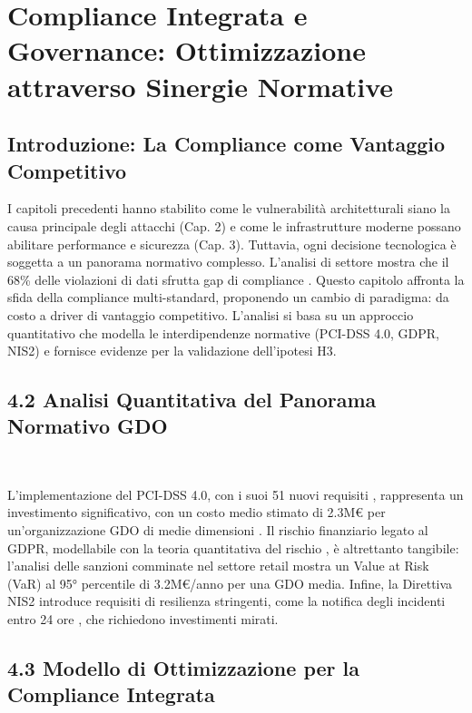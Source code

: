 \chapter{Compliance Integrata e Governance: Ottimizzazione attraverso Sinergie Normative}


\section{Introduzione: La Compliance come Vantaggio Competitivo}

I capitoli precedenti hanno stabilito come le vulnerabilità architetturali siano la causa principale degli attacchi (Cap. 2) e come le infrastrutture moderne possano abilitare performance e sicurezza (Cap. 3). Tuttavia, ogni decisione tecnologica è soggetta a un panorama normativo complesso. L'analisi di settore mostra che il 68\% delle violazioni di dati sfrutta gap di compliance \autocite{verizon2024}. Questo capitolo affronta la sfida della compliance multi-standard, proponendo un cambio di paradigma: da costo a driver di vantaggio competitivo. L'analisi si basa su un approccio quantitativo che modella le interdipendenze normative (PCI-DSS 4.0, GDPR, NIS2) e fornisce evidenze per la validazione dell'ipotesi H3.

\section{4.2 Analisi Quantitativa del Panorama Normativo GDO}\

L'implementazione del PCI-DSS 4.0, con i suoi 51 nuovi requisiti \autocite{pcidss2024}, rappresenta un investimento significativo, con un costo medio stimato di 2.3M€ per un'organizzazione GDO di medie dimensioni \autocite{Gartner2024gdpr}. Il rischio finanziario legato al GDPR, modellabile con la teoria quantitativa del rischio \autocite{mcneil2015}, è altrettanto tangibile: l'analisi delle sanzioni comminate nel settore retail \autocite{EDPB2024} mostra un Value at Risk (VaR) al 95° percentile di 3.2M€/anno per una GDO media. Infine, la Direttiva NIS2 introduce requisiti di resilienza stringenti, come la notifica degli incidenti entro 24 ore \autocite{ENISA2024nis2}, che richiedono investimenti mirati.

\section{4.3 Modello di Ottimizzazione per la Compliance Integrata}

